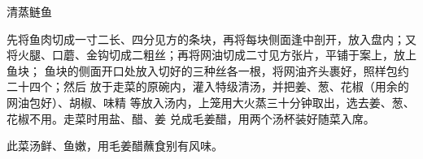 %
%
%
%
%
%
%
\begin{recipe}{清蒸鲢鱼}

\ingredients


\preparation

\step 先将鱼肉切成一寸二长、四分见方的条块，再将每块侧面逢中剖开，放入盘内；又
将火腿、口蘑、金钩切成二粗丝；再将网油切成二寸见方张片，平铺于案上，放上鱼块；
鱼块的侧面开口处放入切好的三种丝各一根，将网油齐头裹好，照样包约二十四个；然后
放于走菜的原碗内，灌入特级清汤，并把姜、葱、花椒（用余的网油包好）、胡椒、味精
等放入汤内，上笼用大火蒸三十分钟取出，选去姜、葱、花椒不用。走菜时用盐、醋、姜
兑成毛姜醋，用两个汤杯装好随菜入席。

\features

此菜汤鲜、鱼嫩，用毛姜醋蘸食别有风味。

\end{recipe}

